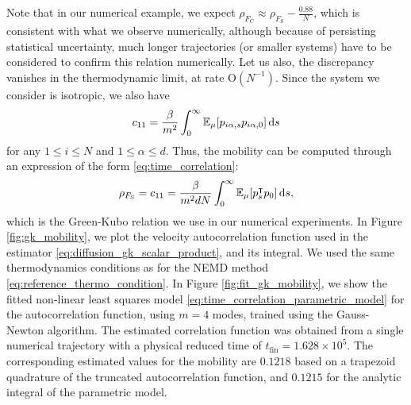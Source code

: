 Note that in our numerical example, we expect $\rho_{F_{\mathrm{C}}}\approx \rho_{F_{\mathrm{S}}}-\frac{0.88}{N}$, which is consistent with what we observe numerically, although because of persisting statistical uncertainty, much longer trajectories (or smaller systems) have to be considered to confirm this relation numerically.
Let us also, the discrepancy vanishes in the thermodynamic limit, at rate $\mathrm{O}(N^{-1})$.
Since the system we consider is isotropic, we also have 
\[c_{11}=\frac{\beta}{m^2}\int_0^\infty\mathbb{E}_\mu[p_{i\alpha,s}p_{i\alpha,0}]\,\mathrm{d} s\]
for any $1\leq i\leq N$ and $1\leq \alpha\leq d$. Thus, the mobility can be computed through an expression of the form \eqref{eq:time_correlation}:
\begin{equation}
    \label{eq:diffusion_gk_scalar_product}
    \rho_{F_{\mathrm{S}}}=c_{11}=\frac{\beta}{m^2 d N}\int_{0}^\infty \mathbb{E}_\mu[p_s^\intercal p_0]\,\mathrm{d} s,
\end{equation}
which is the Green-Kubo relation we use in our numerical experiments. 
In Figure \ref{fig:gk_mobility}, we plot the velocity autocorrelation function used in the estimator \eqref{eq:diffusion_gk_scalar_product}, and its integral. 
We used the same thermodynamics conditions as for the NEMD method \eqref{eq:reference_thermo_condition}. 
In Figure \ref{fig:fit_gk_mobility}, we show the fitted non-linear least squares model \eqref{eq:time_correlation_parametric_model} for the autocorrelation function, using $m=4$ modes, trained using the Gauss-Newton algorithm.
The estimated correlation function was obtained from a single numerical trajectory with a physical reduced time of $t_{\mathrm{fin}}=1.628 \times 10^5$.
The corresponding estimated values for the mobility are $0.1218$ based on a trapezoid quadrature of the truncated autocorrelation function, and $0.1215$ for the analytic integral of the parametric model.


